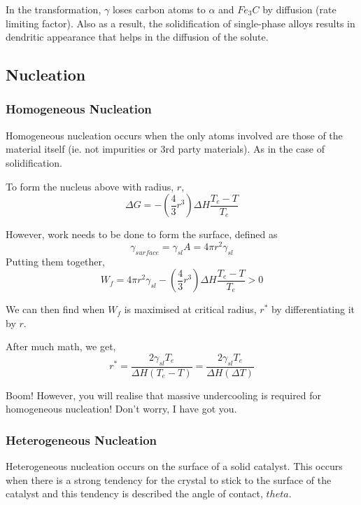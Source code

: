 In the transformation, $\gamma$ loses carbon atoms to $\alpha$ and $Fe_3C$ by diffusion (rate limiting factor). 
Also as a result, the solidification of single-phase alloys results in dendritic appearance that helps in the diffusion of the solute.

\subsection{Nucleation} %
\label{sub:nucleation}
\subsubsection{Homogeneous Nucleation}
Homogeneous nucleation occurs when the only atoms involved are those of the material itself (ie. not impurities or 3rd party materials). As in the case of solidification.

To form the nucleus above with radius, $r$,
\begin{equation}
  \Delta G = - \left( \frac{4}{3}r^3\right)\Delta H \frac{T_e-T}{T_e}
\end{equation}

However, work needs to be done to form the surface, defined as
\begin{equation}
  \gamma_{surface} = \gamma_{sl}A = 4\pi r^2\gamma_{sl}
\end{equation}
Putting them together,
\begin{equation}
  W_f = 4\pi r^2\gamma_{sl} - \left( \frac{4}{3}r^3\right)\Delta H \frac{T_e-T}{T_e} > 0
\end{equation}

We can then find when $W_f$ is maximised at critical radius, $r^*$ by differentiating it by $r$.

After much math, we get,
\begin{equation}
  r^* = \frac{2\gamma_{sl}T_e}{\Delta H (T_e - T)} = \frac{2\gamma_{sl}T_e}{\Delta H (\Delta T)}
\end{equation}

Boom! However, you will realise that massive undercooling is required for homogeneous nucleation! Don't worry, I have got you.

\subsubsection{Heterogeneous Nucleation}
Heterogeneous nucleation occurs on the surface of a solid catalyst. This occurs when there is a strong tendency for the crystal to stick to the surface of the catalyst and this tendency is described the angle of contact, $theta$. 

